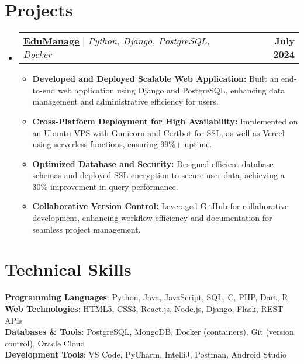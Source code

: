 \documentclass[a4paper,11pt]{article}
\makeatletter
\newcommand{\resumeItem}[1]{
  \item\small{#1 \vspace{-2pt}}
}
\newcommand{\resumeProjectHeading}[2]{
    \item
    \begin{tabular*}{0.97\textwidth}{l@{\extracolsep{\fill}}r}
      \small#1 & \textbf{\small #2} \\
    \end{tabular*}\vspace{-7pt}
}
\newcommand{\resumeSubHeadingListStart}{\begin{itemize}[leftmargin=0.15in, label={}]}
\newcommand{\resumeSubHeadingListEnd}{\end{itemize}}
\newcommand{\resumeItemListStart}{\begin{itemize}}
\newcommand{\resumeItemListEnd}{\end{itemize}\vspace{-5pt}}
\makeatother
\begin{document}
\section{Projects}
\resumeSubHeadingListStart
\resumeProjectHeading
{\textbf{\href{https://github.com/ajmalbuv/EduManage}{\underline{EduManage}}} $|$ \emph{Python, Django, PostgreSQL, Docker}}{July 2024}
\resumeItemListStart
\resumeItem{\textbf{Developed and Deployed Scalable Web Application:} Built an end-to-end web application using Django and PostgreSQL, enhancing data management and administrative efficiency for users.}
\resumeItem{\textbf{Cross-Platform Deployment for High Availability:} Implemented on an Ubuntu VPS with Gunicorn and Certbot for SSL, as well as Vercel using serverless functions, ensuring 99\%+ uptime.}
\resumeItem{\textbf{Optimized Database and Security:} Designed efficient database schemas and deployed SSL encryption to secure user data, achieving a 30\% improvement in query performance.}
\resumeItem{\textbf{Collaborative Version Control:} Leveraged GitHub for collaborative development, enhancing workflow efficiency and documentation for seamless project management.}
\resumeItemListEnd
\resumeSubHeadingListEnd

\section{Technical Skills}
\begin{itemize}[leftmargin=0.15in, label={}]
	\small{\item{
			\textbf{Programming Languages}{: Python, Java, JavaScript, SQL, C, PHP, Dart, R}\\
			\textbf{Web Technologies}{: HTML5, CSS3, React.js, Node.js, Django, Flask, REST APIs}\\
			\textbf{Databases \& Tools}{: PostgreSQL, MongoDB, Docker (containers), Git (version control), Oracle Cloud}\\
			\textbf{Development Tools}{: VS Code, PyCharm, IntelliJ, Postman, Android Studio}
	}}
\end{itemize}
\end{document}

